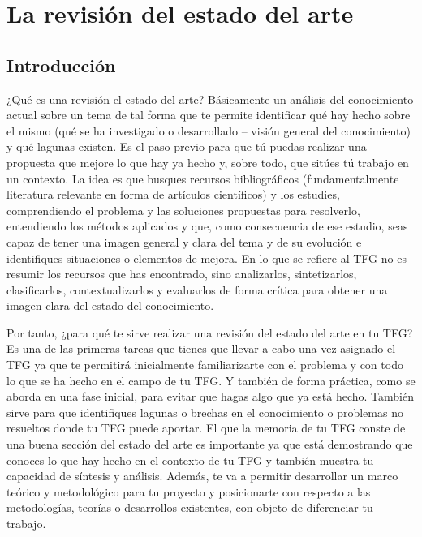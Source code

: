 \chapter{La revisión del estado del arte} \label{cap:RevisionEstadoDelArte}


\section{Introducción}
¿Qué es una revisión el estado del arte? Básicamente un análisis del conocimiento actual sobre un tema de tal forma que te permite identificar qué hay hecho sobre el mismo (qué se ha investigado o desarrollado -- visión general del conocimiento) y qué lagunas existen. Es el paso previo para que tú puedas realizar una propuesta que mejore lo que hay ya hecho y, sobre todo, que sitúes tú trabajo en un contexto. La idea es que busques recursos bibliográficos (fundamentalmente literatura relevante en forma de artículos científicos) y los estudies, comprendiendo el problema y las soluciones propuestas para resolverlo, entendiendo los métodos aplicados y que, como consecuencia de ese estudio, seas capaz de tener una imagen general y clara del tema y de su evolución e identifiques situaciones o elementos de mejora. En lo que se refiere al TFG no es resumir los recursos que has encontrado, sino analizarlos, sintetizarlos, clasificarlos, contextualizarlos y evaluarlos de forma crítica para obtener una imagen clara del estado del conocimiento.

Por tanto, ¿para qué te sirve realizar una revisión del estado del arte en tu TFG? Es una de las primeras tareas que tienes que llevar a cabo una vez asignado el TFG ya que te permitirá inicialmente familiarizarte con el problema y con todo lo que se ha hecho en el campo de tu TFG. Y también de forma práctica, como se aborda en una fase inicial, para evitar que hagas algo que ya está hecho. También sirve para que identifiques lagunas o brechas en el conocimiento o problemas no resueltos donde tu TFG puede aportar. El que la memoria de tu TFG conste de una buena sección del estado del arte es importante ya que está demostrando que conoces lo que hay hecho en el contexto de tu TFG y también muestra tu capacidad de síntesis y análisis. Además, te va a permitir desarrollar un marco teórico y metodológico para tu proyecto y posicionarte con respecto a las metodologías, teorías o desarrollos existentes, con objeto de diferenciar tu trabajo. 

